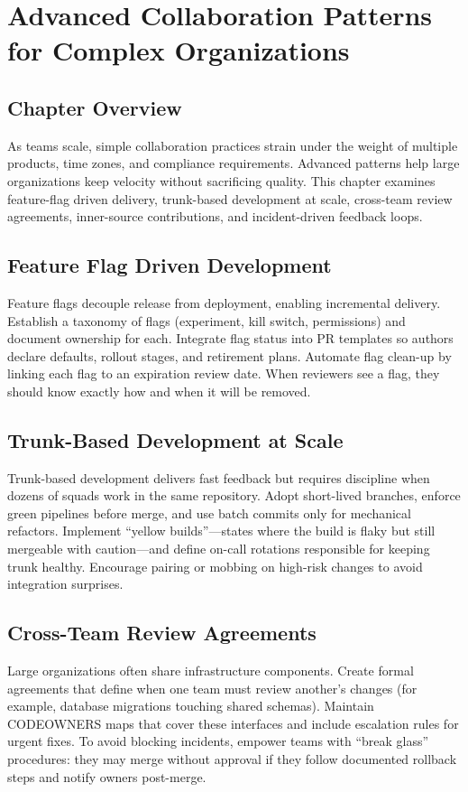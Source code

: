\chapter{Advanced Collaboration Patterns for Complex Organizations}

\section{Chapter Overview}
As teams scale, simple collaboration practices strain under the weight of multiple products, time zones, and compliance requirements. Advanced patterns help large organizations keep velocity without sacrificing quality. This chapter examines feature-flag driven delivery, trunk-based development at scale, cross-team review agreements, inner-source contributions, and incident-driven feedback loops.

\section{Feature Flag Driven Development}
Feature flags decouple release from deployment, enabling incremental delivery. Establish a taxonomy of flags (experiment, kill switch, permissions) and document ownership for each. Integrate flag status into PR templates so authors declare defaults, rollout stages, and retirement plans. Automate flag clean-up by linking each flag to an expiration review date. When reviewers see a flag, they should know exactly how and when it will be removed.

\section{Trunk-Based Development at Scale}
Trunk-based development delivers fast feedback but requires discipline when dozens of squads work in the same repository. Adopt short-lived branches, enforce green pipelines before merge, and use batch commits only for mechanical refactors. Implement ``yellow builds''---states where the build is flaky but still mergeable with caution---and define on-call rotations responsible for keeping trunk healthy. Encourage pairing or mobbing on high-risk changes to avoid integration surprises.

\section{Cross-Team Review Agreements}
Large organizations often share infrastructure components. Create formal agreements that define when one team must review another's changes (for example, database migrations touching shared schemas). Maintain CODEOWNERS maps that cover these interfaces and include escalation rules for urgent fixes. To avoid blocking incidents, empower teams with ``break glass'' procedures: they may merge without approval if they follow documented rollback steps and notify owners post-merge.

